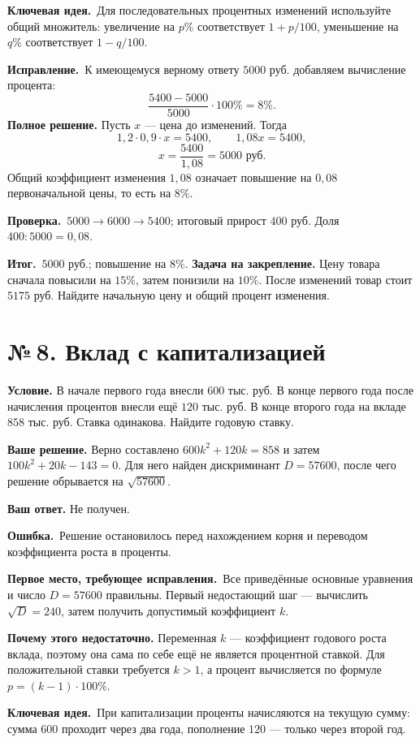 \documentclass[a4paper,12pt]{article}
\newcommand{\errlabel}{\textcolor{err}{\textbf{Ошибка.}}}
\newcommand{\keylabel}{\textcolor{accent}{\textbf{Ключевая идея.}}}
\newcommand{\resultlabel}{\textcolor{accent}{\textbf{Итог.}}}
\newcommand{\reviewtask}[2]{\clearpage\phantomsection\label{task:#1}\section*{\textcolor{accent}{№\,#1. #2}}}
\newcommand{\firstwrong}{\textbf{Первое место, требующее исправления.}}
\newcommand{\fix}{\textbf{Исправление.}}
\newcommand{\verify}{\textbf{Проверка.}}
\newcommand{\practice}{\medskip\textbf{Задача на закрепление.} }
\begin{document}
\keylabel\ Для последовательных процентных изменений используйте общий множитель: увеличение на $p\%$ соответствует $1+p/100$, уменьшение на $q\%$ соответствует $1-q/100$.

\fix\ К имеющемуся верному ответу $5000$ руб. добавляем вычисление процента:
\[
\frac{5400-5000}{5000}\cdot100\%=8\%.
\]
\textbf{Полное решение.} Пусть $x$ --- цена до изменений. Тогда
\[
1{,}2\cdot0{,}9\cdot x=5400,\qquad1{,}08x=5400,
\]
\[
x=\frac{5400}{1{,}08}=5000\text{ руб.}
\]
Общий коэффициент изменения $1{,}08$ означает повышение на $0{,}08$ первоначальной цены, то есть на $8\%$.

\verify\ $5000\to6000\to5400$; итоговый прирост $400$ руб. Доля $400:5000=0{,}08$.

\resultlabel\ $\boxed{5000\text{ руб.; повышение на }8\%}$.
\practice Цену товара сначала повысили на $15\%$, затем понизили на $10\%$. После изменений товар стоит $5175$ руб. Найдите начальную цену и общий процент изменения.

\reviewtask{8}{Вклад с капитализацией}
\textbf{Условие.} В начале первого года внесли $600$ тыс. руб. В конце первого года после начисления процентов внесли ещё $120$ тыс. руб. В конце второго года на вкладе $858$ тыс. руб. Ставка одинакова. Найдите годовую ставку.

\textbf{Ваше решение.} Верно составлено $600k^2+120k=858$ и затем $100k^2+20k-143=0$. Для него найден дискриминант $D=57600$, после чего решение обрывается на $\sqrt{57600}$.

\textbf{Ваш ответ.} Не получен.

\errlabel\ Решение остановилось перед нахождением корня и переводом коэффициента роста в проценты.

\firstwrong\ Все приведённые основные уравнения и число $D=57600$ правильны. Первый недостающий шаг --- вычислить $\sqrt D=240$, затем получить допустимый коэффициент $k$.

\textbf{Почему этого недостаточно.} Переменная $k$ --- коэффициент годового роста вклада, поэтому она сама по себе ещё не является процентной ставкой. Для положительной ставки требуется $k>1$, а процент вычисляется по формуле $p=(k-1)\cdot100\%$.

\keylabel\ При капитализации проценты начисляются на текущую сумму: сумма $600$ проходит через два года, пополнение $120$ --- только через второй год.
\end{document}
